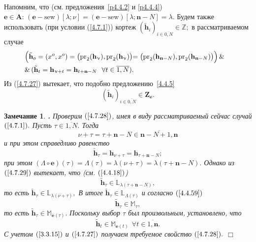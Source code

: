 \documentclass[11pt,twoside,openany]{report}
\newcommand{\bfn}{\begin{equation}}
\newcommand{\efn}{\end{equation}}
\newcommand{\ov}{\overline}
\newcounter{theo}
\newcounter{zam}
\newtheorem{zam}{Замечание}[section]
\newcommand{\TL}{\mbox{\bf{$\!\!$.}}}
\newcommand{\La}{\Lambda}
\newcommand{\la}{\lambda}
\newcommand{\fa}{\forall}
\newcommand{\bbz}{{\mathbb Z}}
\newcommand{\bbl}{{\mathbb L}}
\newcommand{\bbm}{{\mathbb M}}
\newcommand{\nn}{{\mathbf n}}
\begin{document}
{{Напомним, что (см. предложения~\ref{p4.4.2} и \ref{p4.4.4}) $\mathbf{e}\in \mathbf{A}:\,
(\mathbf{e}-\mathrm{sew})[\la;\nu] = (\mathbf{e}-\mathrm{sew})[\la;\nn-N] = \la.$
Будем также использовать (при условии (\ref{4.7.1})) кортеж $(\tilde{\mathbf{h}}_i)_{i\in\ov{0,N}}\in \bbz;$
в рассматриваемом случае
\begin{eqnarray}
&\Bigl(\tilde{\mathbf{h}}_o = (x^o,x^o) = \bigl(\mathrm{pr}_2(\mathbf{h}_\nu),
\mathrm{pr}_2(\mathbf{h}_\nu)\bigl) = \bigl(\mathrm{pr}_2(\mathbf{h}_{\nn-N}),
\mathrm{pr}_2(\mathbf{h}_{\nn-N})\bigl)\Bigl)\,\&
&\nonumber\\
&\&\,(\tilde{\mathbf{h}}_t = \mathbf{h}_{\nu+t} = \mathbf{h}_{t+\nn-N}\ \ \fa t\in \ov{1,N}).
&\label{4.7.27}
\end{eqnarray}
Из (\ref{4.7.27}) вытекает, что подобно предложению~\ref{4.4.5}
\bfn\label{4.7.28}(\tilde{\mathbf{h}}_i)_{i\in\ov{0,N}}\in \mathbf{Z}_\mathbf{e}.
\efn

\begin{zam}\label{z4.7.1}{\TL} Проверим $(\ref{4.7.28})$, имея в виду рассматриваемый
сейчас случай $(\ref{4.7.1}).$ Пусть $\tau\in \ov{1,N}.$ Тогда
$$\nu+\tau = \tau+\nn-N\in \ov{\nn-N+1,\nn}
$$
и при этом справедливо равенство
\bfn\label{4.7.29}\tilde{\mathbf{h}}_\tau = \mathbf{h}_{\nu+\tau} = \mathbf{h}_{\tau+\nn-N};
\efn
при этом $(\La\circ \mathbf{e})(\tau) = \La(\tau) = \la(\nu+\tau) = \la(\tau+\nn-N).$
Однако из $(\ref{4.7.29})$ вытекает, что (см. $(\ref{4.4.18})$)
$$\tilde{\mathbf{h}}_\tau\in\bbl_{\la(\tau+\nn-N)},
$$
то есть $\tilde{\mathbf{h}}_\tau\in\bbl_{\la(\nu+\tau)},$ В итоге
$\tilde{\mathbf{h}}_\tau\in\bbl_{\La(\tau)}$ и согласно $(\ref{4.4.59})$
$$\tilde{\mathbf{h}}_\tau\in\bbm_\tau,
$$
то есть $\tilde{\mathbf{h}}_\tau\in\bbm_{\mathbf{e}(\tau)}.$ Поскольку выбор $\tau$
был произвольным, установлено, что
$$\tilde{\mathbf{h}}_t\in\bbm_{\mathbf{e}(t)}\ \ \fa t\in\ov{1,\nn}.$$
С учетом $(\ref{3.3.15})$ и $(\ref{4.7.27})$ получаем требуемое свойство $(\ref{4.7.28}).$ \hfill $\Box$
\end{zam}

}}
\end{document}

